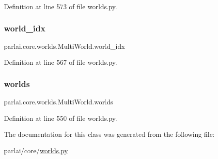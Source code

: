 Definition at line 573 of file worlds.\+py.

\mbox{\label{classparlai_1_1core_1_1worlds_1_1MultiWorld_a3d2a0158d96bed4eead1e3b4138d5242}} 
\subsubsection{\texorpdfstring{world\+\_\+idx}{world\_idx}}
{\footnotesize\ttfamily parlai.\+core.\+worlds.\+Multi\+World.\+world\+\_\+idx}



Definition at line 567 of file worlds.\+py.

\mbox{\label{classparlai_1_1core_1_1worlds_1_1MultiWorld_afd4cbc3c724de6b6bf8f55e6fc56964e}} 
\subsubsection{\texorpdfstring{worlds}{worlds}}
{\footnotesize\ttfamily parlai.\+core.\+worlds.\+Multi\+World.\+worlds}



Definition at line 550 of file worlds.\+py.



The documentation for this class was generated from the following file\+:\begin{DoxyCompactItemize}
\item 
parlai/core/\hyperlink{parlai_2core_2worlds_8py}{worlds.\+py}\end{DoxyCompactItemize}
